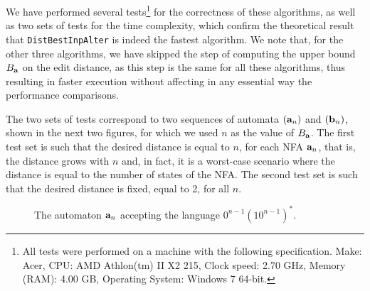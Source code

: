 \documentclass{article}
\theoremstyle{plain}
\theoremstyle{definition}
\theoremstyle{remark}
\newcommand\db{B}             \newcommand\dbold{D}   \newcommand\pssi{\par\smallskip\indent}
\begin{document}
We have performed several
tests\footnote{All tests were performed on a machine with the
following specification.
  Make: Acer,
  CPU: AMD Athlon(tm) II X2 215,
  Clock speed: 2.70 GHz,
  Memory (RAM): 4.00 GB,
  Operating System: Windows 7 64-bit.}
for the correctness
of these algorithms, as well as two sets of tests for the time complexity, which confirm  the theoretical
result that \texttt{DistBestInpAlter}
is indeed the fastest algorithm. We note that, for the
other three algorithms, we have skipped the step of
computing the upper bound $\db_{\aut}$ on the edit distance,
as this step is the same for all these algorithms, thus
resulting in faster execution without affecting in any
essential way the performance comparisons.

The two sets of tests correspond to two sequences of
automata $(\mathbf{a}_n)$ and $(\mathbf{b}_n)$, shown in the next two figures, for which we used $n$ as the value of $\db_{\aut}$.
The first test set is such that the desired distance is equal to $n$, for each NFA $\mathbf{a}_n$, that is, the distance grows
with $n$ and, in fact, it is a worst-case scenario where the
distance is equal to the number of states of the NFA.
The second test set is such that the desired distance is fixed, equal to 2,
for all $n$.
\begin{figure}[ht]
\centering
{}
\parbox{4.3in}{\caption{The automaton $\mathbf{a}_n$ accepting the language $0^{n-1}(10^{n-1})^*$.}\label{fig:testA}}
\end{figure}
\end{document}

